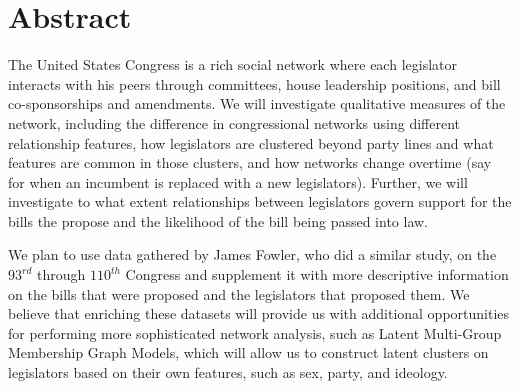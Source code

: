 \section{Abstract}

The United States Congress is a rich social network where each legislator 
interacts with his peers through committees, house leadership positions, and 
bill co-sponsorships and amendments. We will investigate qualitative measures 
of the network, including the difference in congressional networks using 
different relationship features, how legislators are clustered beyond party 
lines and what features are common in those clusters, and how networks change 
overtime (say for when an incumbent is replaced with a new legislators). 
Further, we will investigate to what extent relationships between legislators 
govern support for the bills the propose and the likelihood of the bill being 
passed into law.

We plan to use data gathered by James Fowler, who did a similar study, on the 
$93^{rd}$ through $110^{th}$ Congress and supplement it with more descriptive 
information on the bills that were proposed and the legislators that proposed 
them. We believe that enriching these datasets will provide us with additional 
opportunities for performing more sophisticated network analysis, such as 
Latent Multi-Group Membership Graph Models, which will allow us to construct 
latent clusters on legislators based on their own features, such as sex, 
party, and ideology.
